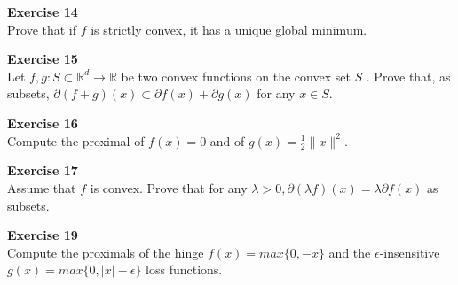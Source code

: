 \documentclass[11pt,table]{article}
\newenvironment{problem}[2][Exercise]
    { \begin{mdframed}[backgroundcolor=gray!20] \textbf{#1 #2} \\}
    {  \end{mdframed}}
\begin{document}
\begin{problem}{14}
  Prove that if \( f \)  is strictly convex, it has a unique global minimum.
\end{problem}


\begin{problem}{15}
  Let \( f,g: S \subset \mathbb{R}^d \to \mathbb{R} \)  be two convex functions on the convex set \( S \) . Prove that, as subsets, \( \partial(f+g)(x) \subset \partial f(x) + \partial g(x) \) for any $x\in S$.
  \end{problem}


\begin{problem}{16}
  Compute the proximal of \( f(x) = 0 \) and of \( g(x) = \frac{1}{2}\|x\|^2 \).
\end{problem}


\begin{problem}{17}
  Assume that \( f \)  is convex. Prove that for any \( \lambda > 0, \partial(\lambda f)(x) = \lambda \partial f(x) \) as subsets.
\end{problem}



\begin{problem}{19}Compute the proximals of the hinge \( f(x) = max\{0, -x\}  \) and the \( \epsilon \)-insensitive \( g(x)=max\{0, |x| - \epsilon\} \) loss functions.
  \end{problem}
\end{document}
